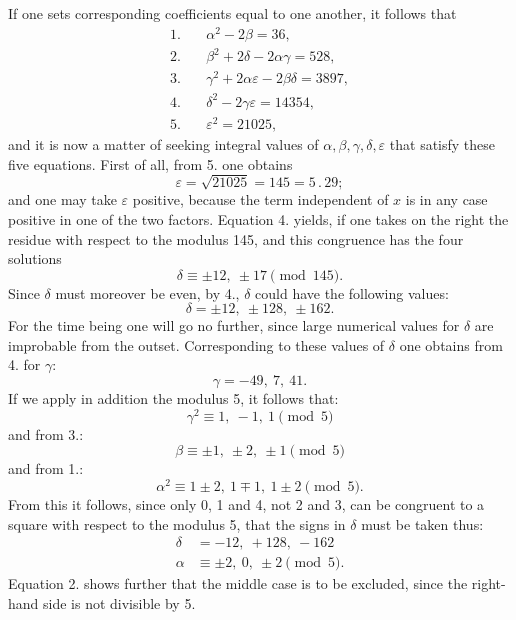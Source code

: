 If one sets corresponding coefficients equal to one another,
it follows that
\[
\begin{aligned}
1.&\quad \alpha^2 - 2\beta = 36,\\
2.&\quad \beta^2 + 2\delta - 2\alpha\gamma = 528,\\
3.&\quad \gamma^2 + 2\alpha\varepsilon - 2\beta\delta = 3897,\\
4.&\quad \delta^2 - 2\gamma\varepsilon = 14354,\\
5.&\quad \varepsilon^2 = 21025,
\end{aligned}
\]
and it is now a matter of seeking integral values of $\alpha, \beta, \gamma, \delta, \varepsilon$
that satisfy these five equations. First of all, from 5. one obtains
\[
\varepsilon = \sqrt{21025} = 145 = 5\,.\,29;
\]
and one may take $\varepsilon$ positive, because the term independent of $x$
is in any case positive in one of the two factors. Equation 4.
yields, if one takes on the right the residue with respect to the modulus
145,
and this congruence has the four solutions
\[
\delta \equiv \pm 12,\ \pm 17 \pmod{145}.
\]
Since $\delta$ must moreover be even, by 4., $\delta$ could have the following
values:
\[
\delta = \pm 12,\ \pm 128,\ \pm 162.
\]
For the time being one will go no further, since large numerical values for
$\delta$ are improbable from the outset. Corresponding to these values of $\delta$
one obtains from 4. for $\gamma$:
\[
\gamma = -49,\ 7,\ 41.
\]
If we apply in addition the modulus 5, it follows that:
\[
\gamma^2 \equiv 1,\ -1,\ 1 \pmod{5}
\]
and from 3.:
\[
\beta \equiv \pm 1,\ \pm 2,\ \pm 1 \pmod{5}
\]
and from 1.:
\[
\alpha^2 \equiv 1 \pm 2,\ 1 \mp 1,\ 1 \pm 2 \pmod{5}.
\]
From this it follows, since only 0, 1 and 4, not 2 and 3, can be
congruent to a square with respect to the modulus 5, that
the signs in $\delta$ must be taken thus:
\[
\begin{aligned}
\delta &= -12,\ +128,\ -162\\
\alpha &\equiv \pm 2,\ 0,\ \pm 2 \pmod{5}.
\end{aligned}
\]
Equation 2. shows further that the middle case is to be excluded, since the right-hand side is not divisible by 5.
